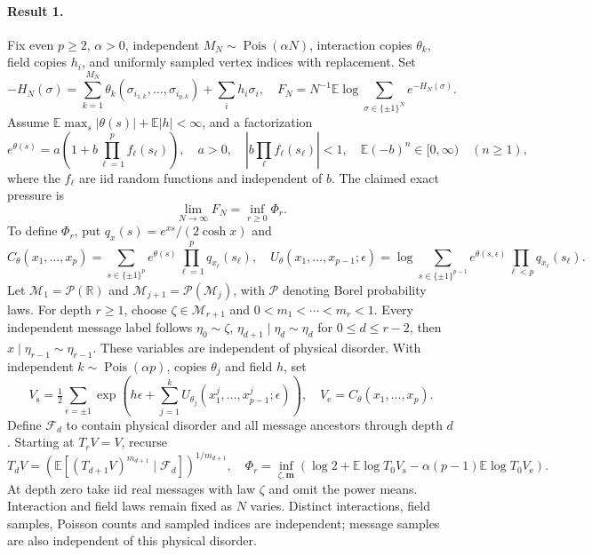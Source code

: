 \documentclass[11pt]{article}
\begin{document}
\paragraph{Result 1.} Fix even \(p\ge2\), \(\alpha>0\), independent \(M_N\sim\operatorname{Pois}(\alpha N)\), interaction copies \(\theta_k\), field copies \(h_i\), and uniformly sampled vertex indices with replacement. Set
\[
 -H_N(\sigma)=\sum_{k=1}^{M_N}\theta_k(\sigma_{i_{1,k}},\ldots,\sigma_{i_{p,k}})+\sum_i h_i\sigma_i,
 \quad F_N=N^{-1}\mathbb E\log\sum_{\sigma\in\{\pm1\}^N}e^{-H_N(\sigma)}.
\]
Assume \(\mathbb E\max_s|\theta(s)|+\mathbb E|h|<\infty\), and a factorization
\[
 e^{\theta(s)}=a\left(1+b\prod_{\ell=1}^pf_\ell(s_\ell)\right),\quad
 a>0,\quad|b\prod_\ell f_\ell(s_\ell)|<1,\quad
 \mathbb E(-b)^n\in[0,\infty)\quad(n\ge1),
\]
where the \(f_\ell\) are iid random functions and independent of \(b\). The claimed exact pressure is
\[
 \lim_{N\to\infty}F_N=\inf_{r\ge0}\Phi_r.
\]
To define $\Phi_r$, put $q_x(s)=e^{xs}/(2\cosh x)$ and
\[
 C_\theta(x_1,\ldots,x_p)=\sum_{s\in\{\pm1\}^p}e^{\theta(s)}\prod_{\ell=1}^pq_{x_\ell}(s_\ell),\quad
 U_\theta(x_1,\ldots,x_{p-1};\epsilon)=\log\sum_{s\in\{\pm1\}^{p-1}}e^{\theta(s,\epsilon)}\prod_{\ell<p}q_{x_\ell}(s_\ell).
\]
Let $\mathcal M_1=\mathcal P(\mathbb R)$ and $\mathcal M_{j+1}=\mathcal P(\mathcal M_j)$, with $\mathcal P$ denoting Borel probability laws. For depth $r\ge1$, choose $\zeta\in\mathcal M_{r+1}$ and $0<m_1<\cdots<m_r<1$. Every independent message label follows $\eta_0\sim\zeta$, $\eta_{d+1}\mid\eta_d\sim\eta_d$ for $0\le d\le r-2$, then $x\mid\eta_{r-1}\sim\eta_{r-1}$. These variables are independent of physical disorder. With independent $k\sim\operatorname{Pois}(\alpha p)$, copies $\theta_j$ and field $h$, set
\[
 V_{\mathrm s}=\tfrac12\sum_{\epsilon=\pm1}\exp\left(h\epsilon+\sum_{j=1}^kU_{\theta_j}(x_1^j,\ldots,x_{p-1}^j;\epsilon)\right),\quad
 V_{\mathrm e}=C_\theta(x_1,\ldots,x_p).
\]
Define $\mathcal F_d$ to contain physical disorder and all message ancestors through depth $d$. Starting at $T_rV=V$, recurse
\[
 T_dV=\left(\mathbb E[(T_{d+1}V)^{m_{d+1}}\mid\mathcal F_d]\right)^{1/m_{d+1}},\quad
 \Phi_r=\inf_{\zeta,\boldsymbol m}\left(\log2+\mathbb E\log T_0V_{\mathrm s}-\alpha(p-1)\mathbb E\log T_0V_{\mathrm e}\right).
\]
At depth zero take iid real messages with law $\zeta$ and omit the power means. Interaction and field laws remain fixed as $N$ varies. Distinct interactions, field samples, Poisson counts and sampled indices are independent; message samples are also independent of this physical disorder.
\end{document}
